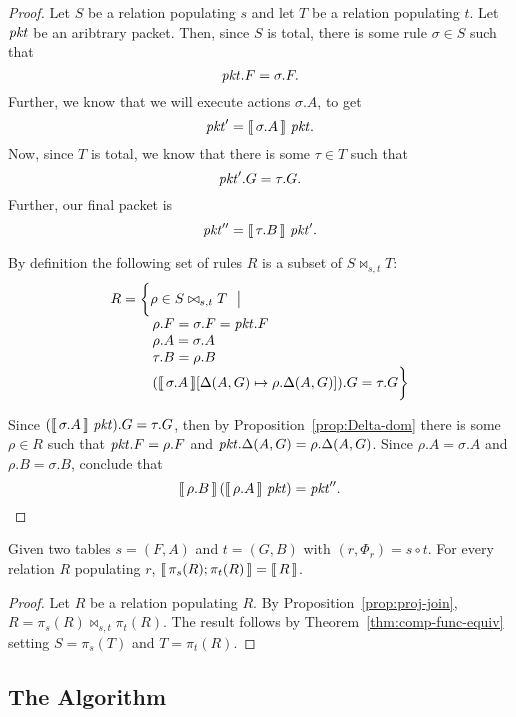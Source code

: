 \begin{proof}
  Let $S$ be a relation populating $s$ and let $T$ be a relation
  populating $t$.
  Let $\mathit{pkt}$ be an aribtrary packet. Then, since $S$ is total, there
  is some rule $\sigma \in S$ such that \[\mathit{pkt}.F = \sigma.F.\] Further, we
  know that we will execute actions $\sigma.A$, to get
  \[\mathit{pkt}' = \llbracket\,\sigma.A\,\rrbracket~\mathit{pkt}.\] Now, since $T$ is total, we know
  that there is some $\tau \in T$ such that \[\mathit{pkt}'.G = \tau.G.\]
  Further, our final packet is \[\mathit{pkt}'' = \llbracket\,\tau.B\,\rrbracket~\mathit{pkt}'.\]

  By definition the following set of rules $R$ is a subset of $S \bowtie_{s,t}T$:
  \[\begin{array}{l}
      R  = \bigg\{\rho \in S \bowtie_{s,t} T~~\big|\\
      \qquad\quad \rho.F = \sigma.F = \mathit{pkt}.F\\
      \qquad\quad \rho.A = \sigma.A \\
      \qquad\quad \tau.B = \rho.B \\
      \qquad\quad (\llbracket\,\sigma.A\,\rrbracket[\Delta(A,G) \mapsto \rho.\Delta(A,G)]).G =\tau.G \bigg\}
    \end{array}\]

  Since $(\llbracket\,\sigma.A\,\rrbracket~\mathit{pkt}).G = \tau.G$, then by
  Proposition~\ref{prop:Delta-dom} there is some $\rho \in R$ such
  that $\mathit{pkt}.F = \rho.F$ and $\mathit{pkt}.\Delta(A,G) =
  \rho.\Delta(A,G)$. Since $\rho.A = \sigma.A$ and
  $\rho.B = \sigma.B$, conclude that
  \[\llbracket\,\rho.B\,\rrbracket\left(\llbracket\,\rho.A\,\rrbracket~\mathit{pkt}\right) = \mathit{pkt}''.\]
\end{proof}


\begin{theorem}
  \label{thm:decomp-func-equiv}
  Given two tables $s = (F,A)$ and $t = (G,B)$ with
  $(r, \Phi_r) = s \circ t$. For every relation $R$ populating $r$, 
  $\llbracket\,\pi_s(R);\pi_t(R)\,\rrbracket = \llbracket\,R\,\rrbracket$.
\end{theorem}

\begin{proof}
  Let $R$ be a relation populating $R$. By
  Proposition~\ref{prop:proj-join},
  $R = \pi_s(R)\bowtie_{s,t}\pi_t(R)$. The result follows by
  Theorem~\ref{thm:comp-func-equiv} setting $S = \pi_s(T)$ and
  $T=\pi_t(R)$.
\end{proof}

\subsection{The Algorithm}

